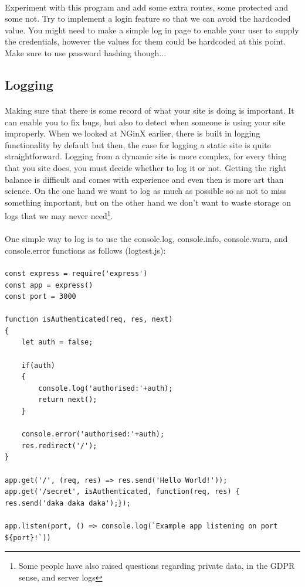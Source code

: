 \documentclass[10pt, a4paper, twosize]{article}
\begin{document}
\paragraph{} Experiment with this program and add some extra routes, some protected and some not. Try to implement a login feature so that we can avoid the hardcoded value. You might need to make a simple log in page to enable your user to supply the credentials, however the values for them could be hardcoded at this point. Make sure to use password hashing though...

\subsection*{Logging}
\paragraph{} Making sure that there is some record of what your site is doing is important. It can enable you to fix bugs, but also to detect when someone is using your site improperly. When we looked at NGinX earlier, there is built in logging functionality by default but then, the case for logging a static site is quite straightforward. Logging from a dynamic site is more complex, for every thing that you site does, you must decide whether to log it or not. Getting the right balance is difficult and comes with experience and even then is more art than science. On the one hand we want to log as much as possible so as not to miss something important, but on the other hand we don't want to waste storage on logs that we may never need\footnote{Some people have also raised questions regarding private data, in the GDPR sense, and server logs}.

\paragraph{} One simple way to log is to use the console.log, console.info, console.warn, and console.error functions as follows (logtest.js):

\paragraph{}
\begin{lstlisting}
const express = require('express')
const app = express()
const port = 3000

function isAuthenticated(req, res, next)
{
    let auth = false;

    if(auth)
    {
        console.log('authorised:'+auth);
        return next();
    }

    console.error('authorised:'+auth);
    res.redirect('/');
}

app.get('/', (req, res) => res.send('Hello World!'));
app.get('/secret', isAuthenticated, function(req, res) { res.send('daka daka daka');});

app.listen(port, () => console.log(`Example app listening on port ${port}!`))
\end{lstlisting}
\end{document}
